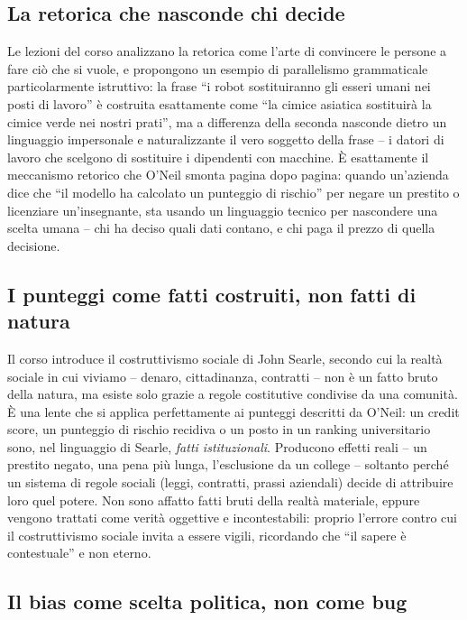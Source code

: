 \documentclass[a4paper,11pt]{article}
\begin{document}
\subsection{La retorica che nasconde chi decide}

Le lezioni del corso analizzano la retorica come l'arte di convincere le persone a fare ciò che si vuole, e propongono un esempio di parallelismo grammaticale particolarmente istruttivo: la frase ``i robot sostituiranno gli esseri umani nei posti di lavoro'' è costruita esattamente come ``la cimice asiatica sostituirà la cimice verde nei nostri prati'', ma a differenza della seconda nasconde dietro un linguaggio impersonale e naturalizzante il vero soggetto della frase -- i datori di lavoro che scelgono di sostituire i dipendenti con macchine. È esattamente il meccanismo retorico che O'Neil smonta pagina dopo pagina: quando un'azienda dice che ``il modello ha calcolato un punteggio di rischio'' per negare un prestito o licenziare un'insegnante, sta usando un linguaggio tecnico per nascondere una scelta umana -- chi ha deciso quali dati contano, e chi paga il prezzo di quella decisione.

\subsection{I punteggi come fatti costruiti, non fatti di natura}

Il corso introduce il costruttivismo sociale di John Searle, secondo cui la realtà sociale in cui viviamo -- denaro, cittadinanza, contratti -- non è un fatto bruto della natura, ma esiste solo grazie a regole costitutive condivise da una comunità. È una lente che si applica perfettamente ai punteggi descritti da O'Neil: un credit score, un punteggio di rischio recidiva o un posto in un ranking universitario sono, nel linguaggio di Searle, \emph{fatti istituzionali}. Producono effetti reali -- un prestito negato, una pena più lunga, l'esclusione da un college -- soltanto perché un sistema di regole sociali (leggi, contratti, prassi aziendali) decide di attribuire loro quel potere. Non sono affatto fatti bruti della realtà materiale, eppure vengono trattati come verità oggettive e incontestabili: proprio l'errore contro cui il costruttivismo sociale invita a essere vigili, ricordando che ``il sapere è contestuale'' e non eterno.

\subsection{Il bias come scelta politica, non come bug}
\end{document}
